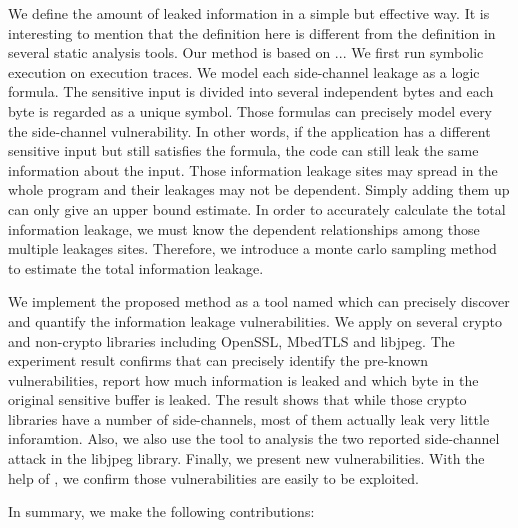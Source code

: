 We define the amount of leaked information in a simple but effective way. It is interesting to 
mention that the definition here is different from the definition in several static analysis 
tools.
Our method is based on ... 
We first run symbolic 
execution on execution traces. We model each side-channel leakage as a logic formula. 
The sensitive input is divided into several independent bytes and each byte is regarded as 
a unique symbol. Those formulas can precisely model every the side-channel vulnerability. 
In other words, if the application has a different sensitive input but still satisfies the formula, 
the code can still leak the same information about the input.  
Those information leakage sites may spread in the whole program 
and their leakages may not be dependent. Simply adding them up can only give an upper bound 
estimate. In order to accurately calculate the total information leakage, we must know the 
dependent relationships among those multiple leakages sites. Therefore, we introduce a 
monte carlo sampling method to estimate the total information leakage.

We implement the proposed method as a tool named \tool{} which can precisely discover and quantify the information
leakage vulnerabilities. We apply \tool{} on several crypto and non-crypto libraries including OpenSSL,
MbedTLS and libjpeg. The experiment result confirms that \tool{} can precisely identify the pre-known vulnerabilities,
report how much information is leaked and which byte in the original sensitive buffer is leaked. 
The result shows that while those crypto libraries have a number of side-channels, most of them actually
leak very little inforamtion. Also, we also use the tool to analysis the two reported side-channel attack 
in the libjpeg library. Finally, we present new vulnerabilities. With the help of \tool{}, we confirm those
vulnerabilities are easily to be exploited.

In summary, we make the following contributions:

